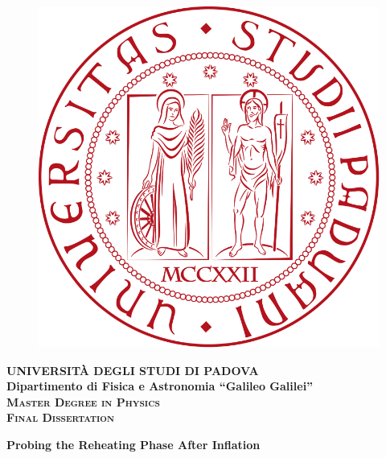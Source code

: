 \documentclass[11pt,a4paper,twoside]{book}
\begin{document}
	\frontmatter
	\begin{titlepage}
		\vspace{5mm}
		\begin{figure}[hbtp]
			\centering
			\includegraphics[scale=.16]{Logo_unipd.png}
		\end{figure}
		\vspace{5mm}
		\begin{center}
			{{\huge{\textsc{\bf UNIVERSIT\`A DEGLI STUDI DI PADOVA}}}\\}
			\vspace{5mm}
			{\Large{\bf Dipartimento di Fisica e Astronomia ``Galileo Galilei''}} \\
			\vspace{5mm}
			{\Large{\textsc{\bf Master Degree in Physics}}}\\
			\vspace{20mm}
			{\Large{\textsc{\bf Final Dissertation}}}\\
			\vspace{30mm}
			\begin{spacing}{3}
				{\LARGE \textbf{Probing the Reheating Phase After Inflation}}\\
			\end{spacing}
			\vspace{8mm}
		\end{center}
		

\end{titlepage}
\end{document}
